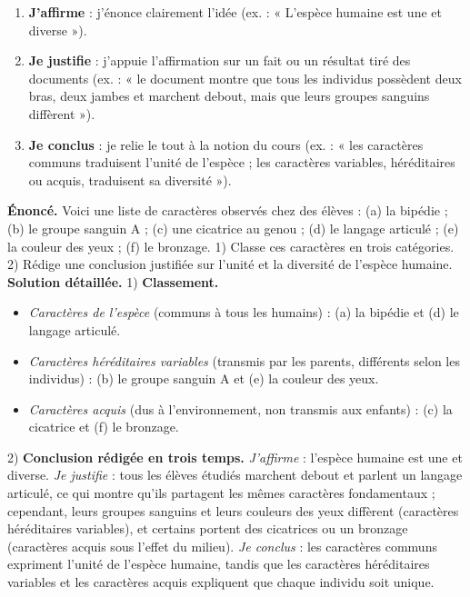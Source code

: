 \documentclass[11pt]{article}
\begin{document}
\begin{methode}
\begin{enumerate}
\item \textbf{J'affirme} : j'énonce clairement l'idée (ex. : « L'espèce humaine est une et diverse »).
\item \textbf{Je justifie} : j'appuie l'affirmation sur un fait ou un résultat tiré des documents (ex. : « le document montre que tous les individus possèdent deux bras, deux jambes et marchent debout, mais que leurs groupes sanguins diffèrent »).
\item \textbf{Je conclus} : je relie le tout à la notion du cours (ex. : « les caractères communs traduisent l'unité de l'espèce ; les caractères variables, héréditaires ou acquis, traduisent sa diversité »).
\end{enumerate}
\end{methode}

\begin{exoresolu}
\textbf{Énoncé.} Voici une liste de caractères observés chez des élèves : (a) la bipédie ; (b) le groupe sanguin A ; (c) une cicatrice au genou ; (d) le langage articulé ; (e) la couleur des yeux ; (f) le bronzage. 1) Classe ces caractères en trois catégories. 2) Rédige une conclusion justifiée sur l'unité et la diversité de l'espèce humaine.
\tcblower
\textbf{Solution détaillée.}
1) \textbf{Classement.}
\begin{itemize}
\item \emph{Caractères de l'espèce} (communs à tous les humains) : (a) la bipédie et (d) le langage articulé.
\item \emph{Caractères héréditaires variables} (transmis par les parents, différents selon les individus) : (b) le groupe sanguin A et (e) la couleur des yeux.
\item \emph{Caractères acquis} (dus à l'environnement, non transmis aux enfants) : (c) la cicatrice et (f) le bronzage.
\end{itemize}
2) \textbf{Conclusion rédigée en trois temps.} \emph{J'affirme} : l'espèce humaine est une et diverse. \emph{Je justifie} : tous les élèves étudiés marchent debout et parlent un langage articulé, ce qui montre qu'ils partagent les mêmes caractères fondamentaux ; cependant, leurs groupes sanguins et leurs couleurs des yeux diffèrent (caractères héréditaires variables), et certains portent des cicatrices ou un bronzage (caractères acquis sous l'effet du milieu). \emph{Je conclus} : les caractères communs expriment l'unité de l'espèce humaine, tandis que les caractères héréditaires variables et les caractères acquis expliquent que chaque individu soit unique.
\end{exoresolu}
\end{document}
